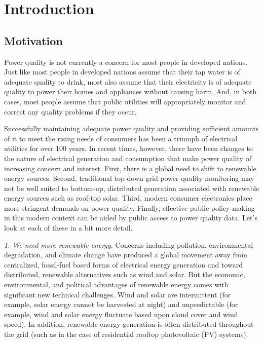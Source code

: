\section{Introduction}


\subsection{Motivation}

Power quality is not currently a concern for most people in developed nations. Just like most people in developed nations assume that their tap water is of adequate quality to drink, most also assume that their electricity is of adequate quality to power their homes and appliances without causing harm. And, in both cases, most people assume that public utilities will appropriately monitor and correct any quality problems if they occur.

Successfully maintaining adequate power quality and providing sufficient amounts of it to meet the rising needs of consumers has been a triumph of electrical utilities for over 100 years. In recent times, however, there have been changes to the nature of electrical generation and consumption that make power quality of increasing concern and interest. First, there is a global need to shift to renewable energy sources. Second, traditional top-down grid power quality monitoring may not be well suited to bottom-up, distributed generation associated with renewable energy sources such as roof-top solar. Third, modern consumer electronics place more stringent demands on power quality.  Finally, effective public policy making in this modern context can be aided by public access to power quality data.  Let's look at each of these in a bit more detail.

{\em 1. We need more renewable energy.} Concerns including pollution, environmental degradation, and climate change have produced a global movement away from centralized, fossil-fuel based forms of electrical energy generation and toward distributed, renewable alternatives such as wind and solar. But the economic, environmental, and political advantages of renewable energy comes with significant new technical challenges. Wind and solar are intermittent (for example, solar energy cannot be harvested at night) and unpredictable (for example, wind and solar energy fluctuate based upon cloud cover and wind speed). In addition, renewable energy generation is often distributed throughout the grid (such as in the case of residential rooftop photovoltaic (PV) systems).


